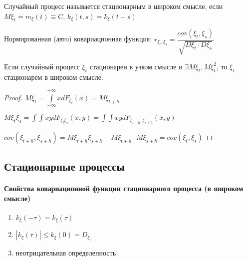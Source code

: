\begin{definition}
  Случайный процесс называется стационарным в широком смысле, если 
  $M\xi_t = m_\xi(t) \equiv C$, $k_\xi(t, s) = k_\xi(t-s)$
\end{definition}

\begin{definition}
  Нормированная (авто) ковариационная функция:
  $r_{\xi_t, \xi_s} = \dfrac{cov(\xi_t, \xi_s)}{\sqrt{D\xi_t \cdot D\xi_s}}$
\end{definition}

\begin{theorem}[о связи]
  Если случайный процесс $\xi_t$ стационарен в узком смысле и $\exists M\xi_t, M\xi^2_t$, 
  то $\xi_t$ стационарем в широком смысле.
\end{theorem}
\begin{proof}
  $M\xi_t = \int\limits_{-\infty}^{+\infty} x dF_{\xi_t} (x) = M\xi_{t+h}$

  $M\xi_t \xi_s = \int\int xy dF_{\xi_t \xi_s} (x, y) = \int\int xy dF_{\xi_{t+h}, \xi_{s+h}} (x, y)$

  $cov(\xi_{t+h}, \xi_{s+h}) = M\xi_{t+h} \xi_{s+h} - M\xi_{t+h} \cdot M\xi_{s+h} = cov(\xi_t, \xi_s)$
\end{proof}

\subsection{Стационарные процессы}

\paragraph{Свойства ковариационной функции стационарного процесса (в широком смысле)}

\begin{enumerate}
  \item $k_\xi(-\tau) = k_\xi (\tau)$
  \item $|k_\xi(\tau)| \leqslant k_\xi(0) = D_{\xi_t}$
  \item неотрицательная определенность
\end{enumerate}

